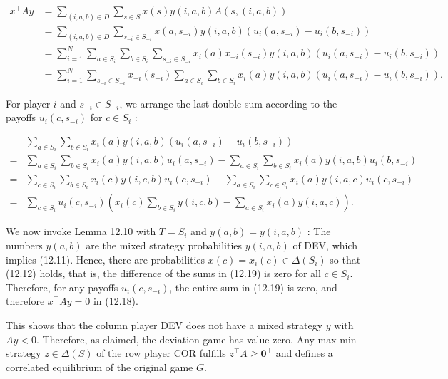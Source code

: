 \documentclass[12pt]{article}
\begin{document}
\begin{align*}
x^{\top} A y & =\sum_{(i, a, b) \in D} \sum_{s \in S} x(s) y(i, a, b) A(s,(i, a, b)) \\
& =\sum_{(i, a, b) \in D} \sum_{s_{-i} \in S_{-i}} x\left(a, s_{-i}\right) y(i, a, b)\left(u_{i}\left(a, s_{-i}\right)-u_{i}\left(b, s_{-i}\right)\right) \\
& =\sum_{i=1}^{N} \sum_{a \in S_{i}} \sum_{b \in S_{i}} \sum_{s_{-i} \in S_{-i}} x_{i}(a) x_{-i}\left(s_{-i}\right) y(i, a, b)\left(u_{i}\left(a, s_{-i}\right)-u_{i}\left(b, s_{-i}\right)\right) \\
& =\sum_{i=1}^{N} \sum_{s_{-i} \in S_{-i}} x_{-i}\left(s_{-i}\right) \sum_{a \in S_{i}} \sum_{b \in S_{i}} x_{i}(a) y(i, a, b)\left(u_{i}\left(a, s_{-i}\right)-u_{i}\left(b, s_{-i}\right)\right) . \tag{12.18}
\end{align*}


For player $i$ and $s_{-i} \in S_{-i}$, we arrange the last double sum according to the payoffs $u_{i}\left(c, s_{-i}\right)$ for $c \in S_{i}$ :


\begin{align*}
& \sum_{a \in S_{i}} \sum_{b \in S_{i}} x_{i}(a) y(i, a, b)\left(u_{i}\left(a, s_{-i}\right)-u_{i}\left(b, s_{-i}\right)\right) \\
= & \sum_{a \in S_{i}} \sum_{b \in S_{i}} x_{i}(a) y(i, a, b) u_{i}\left(a, s_{-i}\right)-\sum_{a \in S_{i}} \sum_{b \in S_{i}} x_{i}(a) y(i, a, b) u_{i}\left(b, s_{-i}\right) \\
= & \sum_{c \in S_{i}} \sum_{b \in S_{i}} x_{i}(c) y(i, c, b) u_{i}\left(c, s_{-i}\right)-\sum_{a \in S_{i}} \sum_{c \in S_{i}} x_{i}(a) y(i, a, c) u_{i}\left(c, s_{-i}\right) \\
= & \sum_{c \in S_{i}} u_{i}\left(c, s_{-i}\right)\left(x_{i}(c) \sum_{b \in S_{i}} y(i, c, b)-\sum_{a \in S_{i}} x_{i}(a) y(i, a, c)\right) . \tag{12.19}
\end{align*}


We now invoke Lemma 12.10 with $T=S_{i}$ and $y(a, b)=y(i, a, b)$ : The numbers $y(a, b)$ are the mixed strategy probabilities $y(i, a, b)$ of DEV, which implies (12.11). Hence, there are probabilities $x(c)=x_{i}(c) \in \Delta\left(S_{i}\right)$ so that (12.12) holds, that is, the difference of the sums in (12.19) is zero for all $c \in S_{i}$. Therefore, for any payoffs $u_{i}\left(c, s_{-i}\right)$, the entire sum in (12.19) is zero, and therefore $x^{\top} A y=0$ in (12.18).

This shows that the column player DEV does not have a mixed strategy $y$ with $A y<0$. Therefore, as claimed, the deviation game has value zero. Any max-min strategy $z \in \Delta(S)$ of the row player COR fulfills $z^{\top} A \geq \mathbf{0}^{\top}$ and defines a correlated equilibrium of the original game $G$.
\end{document}
